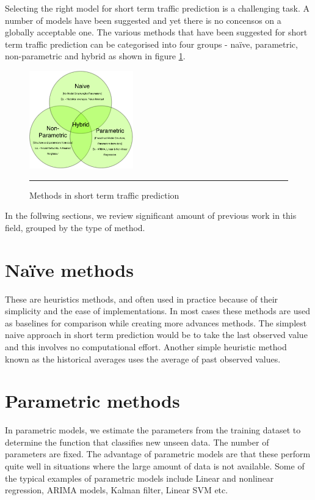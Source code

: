 Selecting the right model for short term traffic prediction is a challenging task. A number of
models have been suggested and yet there is no concensos on a globally acceptable one. The various
methods that have been suggested for short term traffic prediction can be categorised into four
groups - naïve, parametric, non-parametric and hybrid as shown in figure \ref{fig:sttp-methods}.

\begin{figure}[htbp]
  \centering
    \includegraphics[width=0.4\textwidth,height=0.4\textheight,keepaspectratio]{Figures/sttp-methods.pdf}
    \rule{35em}{0.5pt}
  \caption[Methods in short term traffic prediction]{Methods in short term traffic prediction}
  \label{fig:sttp-methods}
\end{figure}

In the follwing sections, we review significant amount of previous work in this field, grouped by the
type of method.

\section{Naïve methods}
These are heuristics methods, and often used in practice because of their simplicity and the ease
of implementations. In most cases these methods are used as baselines for comparison while
creating more advances methods. The simplest naive approach in short term prediction would be to
take the last observed value and this involves no computational effort. Another simple heuristic
method known as the historical averages uses the average of past observed values.

\section{Parametric methods}
In parametric models, we estimate the parameters from the training dataset to determine the
function that classifies new unseen data. The number of parameters are fixed. The advantage of
parametric models are that these perform quite well in situations where the large amount of data
is not available. Some of the typical examples of parametric models include Linear and
nonlinear regression, ARIMA models, Kalman filter, Linear SVM etc.

